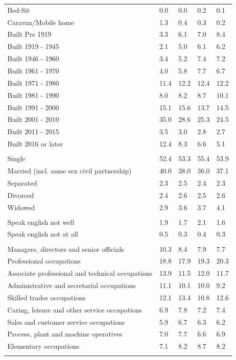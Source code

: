 \documentclass{article}
\begin{document}
\begin{table}[h]
\begin{tabular}{KTTTT}
Bed-Sit & 0.0& 0.0& 0.2& 0.1\\
Caravan/Mobile home & 1.3& 0.4& 0.3& 0.2\\
    \hline
Built Pre 1919 & 3.3& 6.1& 7.0& 8.4\\
Built 1919 - 1945 & 2.1& 5.0& 6.1& 6.2\\
Built  1946 - 1960 & 3.4& 5.2& 7.4& 7.2\\
Built  1961 - 1970 & 4.0& 5.8& 7.7& 6.7\\
Built  1971 - 1980 & 11.4& 12.2& 12.4& 12.2\\
Built  1981 - 1990 &  8.0&  8.2&  8.7& 10.1\\
Built  1991 - 2000 & 15.1& 15.6& 13.7& 14.5\\
Built  2001 - 2010 & 35.0& 28.6& 25.3& 24.5\\
Built  2011 - 2015 & 3.5& 3.0& 2.8& 2.7\\
Built  2016 or later & 12.4&  8.3&  6.6&  5.1\\
\hline
    \\
    \hline
Single & 52.4& 53.3& 55.4& 53.9\\
Married (incl. same sex civil partnership) & 40.0& 38.0& 36.0& 37.1\\
Separated  & 2.3& 2.5& 2.4& 2.3\\
Divorced  & 2.4& 2.6& 2.5& 2.6\\
Widowed & 2.9& 3.6& 3.7& 4.1\\
\hline
    \\ 
    \hline
Speak english not well & 1.9& 1.7& 2.1& 1.6\\
Speak english not at all & 0.5& 0.3& 0.4& 0.3\\
\hline
    \\
    \hline
Managers, directors and senior officials & 10.3&  8.4&  7.9&  7.7\\
Professional occupations & 18.8& 17.9& 19.3& 20.3\\
Associate professional and technical occupations & 13.9& 11.5& 12.0& 11.7\\
Administrative and secretarial occupations & 11.1& 10.1& 10.0&  9.2\\
Skilled trades occupations & 12.1& 13.4& 10.8& 12.6\\
Caring, leisure and other service occupations & 6.9& 7.8& 7.2& 7.4\\
Sales and customer service occupations & 5.9& 6.7& 6.3& 6.2\\
Process, plant and machine operatives & 7.0& 7.7& 6.6& 6.9\\
Elementary occupations & 7.1& 8.2& 8.7& 8.2\\
\hline
\end{tabular}
\end{table}
\end{document}
